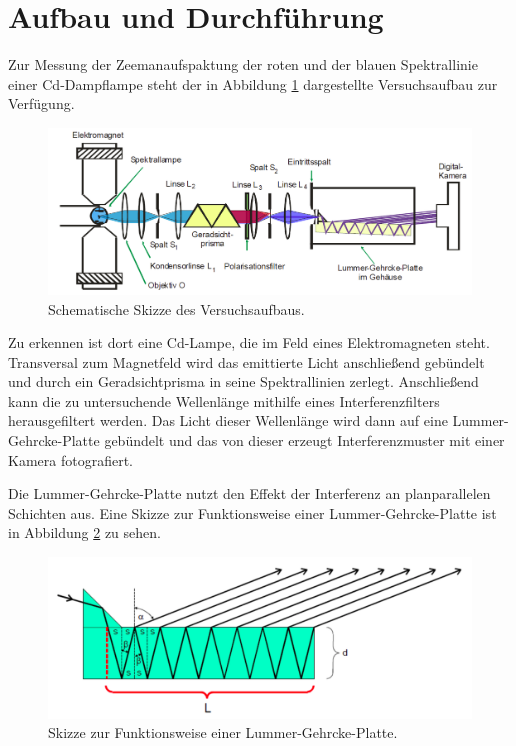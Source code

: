\section{Aufbau und Durchführung}
\label{sec:Durchführung}

Zur Messung der Zeemanaufspaktung der roten und der blauen Spektrallinie einer
Cd-Dampflampe steht der in Abbildung \ref{fig:aufbau} dargestellte Versuchsaufbau zur Verfügung.

\begin{figure}
  \centering
  \includegraphics[width=\textwidth]{data/aufbau.png}
  \caption{Schematische Skizze des Versuchsaufbaus. \cite{Versuchsanleitung}}
  \label{fig:aufbau}
\end{figure}

Zu erkennen ist dort eine Cd-Lampe, die im Feld eines Elektromagneten steht. Transversal
zum Magnetfeld wird das emittierte Licht anschließend gebündelt und durch ein
Geradsichtprisma in seine Spektrallinien zerlegt. Anschließend kann die zu untersuchende
Wellenlänge mithilfe eines Interferenzfilters herausgefiltert werden. Das Licht dieser
Wellenlänge wird dann auf eine Lummer-Gehrcke-Platte gebündelt und das von dieser
erzeugt Interferenzmuster mit einer Kamera fotografiert.

Die Lummer-Gehrcke-Platte nutzt den Effekt der Interferenz an planparallelen Schichten aus.
Eine Skizze zur Funktionsweise einer Lummer-Gehrcke-Platte ist in Abbildung
\ref{fig:lummer} zu sehen.

\begin{figure}
  \centering
  \includegraphics[width=\textwidth]{data/lummer.png}
  \caption{Skizze zur Funktionsweise einer Lummer-Gehrcke-Platte. \cite{Versuchsanleitung}}
  \label{fig:lummer}
\end{figure}

